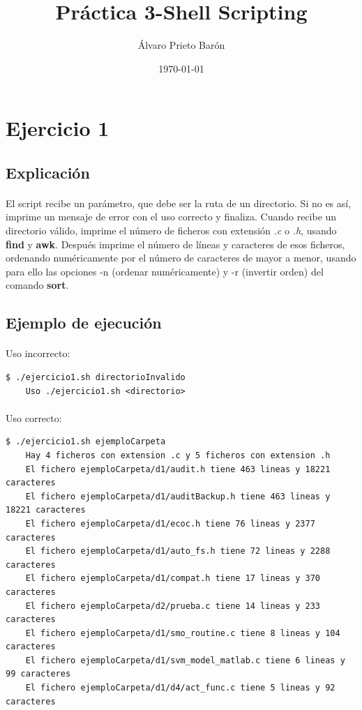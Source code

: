 \documentclass[12pt,a4paper]{article}
\title{Práctica 3-Shell Scripting}
\author{Álvaro Prieto Barón}
\date{\today}
\begin{document}
\maketitle
\pagebreak
\tableofcontents
\pagebreak

\section{Ejercicio 1}
\subsection{Explicación}
\paragraph{}
El script recibe un parámetro, que debe ser la ruta de un directorio. Si no es así, imprime un mensaje de error con el uso correcto y finaliza. Cuando recibe un directorio válido, imprime el número de ficheros con extensión \textit{.c} o \textit{.h}, usando \textbf{find} y \textbf{awk}. Después imprime el número de líneas y caracteres de esos ficheros, ordenando numéricamente por el número de caracteres de mayor a menor, usando para ello las opciones -n (ordenar numéricamente) y -r (invertir orden) del comando \textbf{sort}. 

\subsection{Ejemplo de ejecución}
\paragraph{}
Uso incorrecto:
\begin{lstlisting}[basicstyle=\ttfamily\scriptsize]
$ ./ejercicio1.sh directorioInvalido
	Uso ./ejercicio1.sh <directorio>
\end{lstlisting}
\paragraph{}
Uso correcto:
\begin{lstlisting}[basicstyle=\ttfamily\scriptsize]
$ ./ejercicio1.sh ejemploCarpeta
	Hay 4 ficheros con extension .c y 5 ficheros con extension .h
	El fichero ejemploCarpeta/d1/audit.h tiene 463 lineas y 18221 caracteres
	El fichero ejemploCarpeta/d1/auditBackup.h tiene 463 lineas y 18221 caracteres
	El fichero ejemploCarpeta/d1/ecoc.h tiene 76 lineas y 2377 caracteres
	El fichero ejemploCarpeta/d1/auto_fs.h tiene 72 lineas y 2288 caracteres
	El fichero ejemploCarpeta/d1/compat.h tiene 17 lineas y 370 caracteres
	El fichero ejemploCarpeta/d2/prueba.c tiene 14 lineas y 233 caracteres
	El fichero ejemploCarpeta/d1/smo_routine.c tiene 8 lineas y 104 caracteres
	El fichero ejemploCarpeta/d1/svm_model_matlab.c tiene 6 lineas y 99 caracteres
	El fichero ejemploCarpeta/d1/d4/act_func.c tiene 5 lineas y 92 caracteres
\end{lstlisting}
\end{document}
